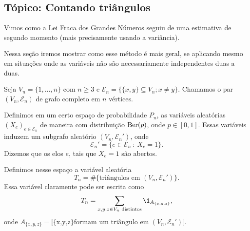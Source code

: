 \begin{topics}

\section{Tópico: Contando triângulos}

Vimos como a Lei Fraca dos Grandes Números seguiu de uma estimativa de segundo momento  (mais precisamente usando a variância).

Nessa seção iremos mostrar como esse método é mais geral, se aplicando mesmo em situações onde as variáveis não são necessariamente independentes duas a duas.

Seja $V_n = \{1, \dots, n\}$ com $n \geq 3$ e $\mathcal{E}_n = \big\{ \{x,y\} \subseteq V_n; x \neq y \big\}$.
Chamamos o par $(V_n, \mathcal{E}_n)$ de grafo completo em $n$ vértices.

Definimos em um certo espaço de probabilidade $P_n$, as variáveis aleatórias $(X_e)_{e \in \mathcal{E}_n}$ de maneira \iid com distribuição $\operatorname{Ber}(p)$, onde $p \in [0,1]$.
Essas variáveis induzem um subgrafo aleatório $(V_n, \mathcal{E}_n')$, onde
\begin{equation}
  \mathcal{E}_n' = \big\{ e \in \mathcal{E}_n\ : \  X_e = 1 \big\}.
\end{equation}
Dizemos que os elos $e$, tais que $X_e = 1$ são abertos.

Definimos nesse espaço a variável aleatória
\begin{equation}
  T_n = \#\big\{\text{triângulos em $(V_n, \mathcal{E}_n')$}\big\}.
\end{equation}
Essa variável claramente pode ser escrita como
\begin{equation}
  T_n = \sum_{x,y,z \in V_n \text{ distintos}} \1_{A_{\{x,y,z\}}},
\end{equation}
onde $A_{\{x,y,z\}} = \big[\text{\{x,y,z\} formam um triângulo em $(V_n, \mathcal{E}_n')$}\big]$.


\end{topics}
